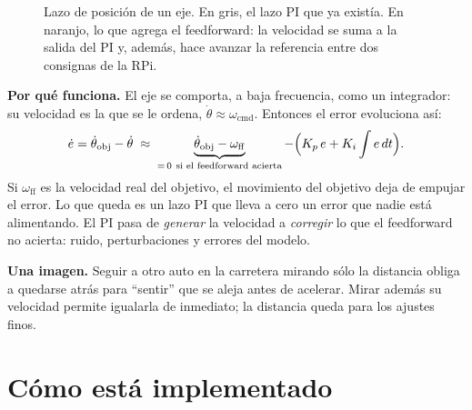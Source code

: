 \documentclass[11pt,a4paper]{article}
\begin{document}
\begin{figure}[H]
\caption{Lazo de posición de un eje. En gris, el lazo PI que ya existía. En naranjo, lo que agrega el feedforward:
la velocidad se suma a la salida del PI y, además, hace avanzar la referencia entre dos consignas de la RPi.}
\label{fig:bloques}
\end{figure}

\textbf{Por qué funciona.} El eje se comporta, a baja frecuencia, como un integrador: su velocidad es la que se
le ordena, $\dot\theta \approx \omega_{\mathrm{cmd}}$. Entonces el error evoluciona así:
\begin{equation}
  \dot e = \dot\theta_{\mathrm{obj}} - \dot\theta \;\approx\; \underbrace{\dot\theta_{\mathrm{obj}} - \omega_{\mathrm{ff}}}_{=\,0\ \text{si el feedforward acierta}} - \Bigl(K_p\, e + K_i \int e\,dt\Bigr).
\end{equation}
Si $\omega_{\mathrm{ff}}$ es la velocidad real del objetivo, el movimiento del objetivo deja de empujar el error.
Lo que queda es un lazo PI que lleva a cero un error que nadie está alimentando. El PI pasa de \emph{generar} la
velocidad a \emph{corregir} lo que el feedforward no acierta: ruido, perturbaciones y errores del modelo.

\textbf{Una imagen.} Seguir a otro auto en la carretera mirando sólo la distancia obliga a quedarse atrás para
``sentir'' que se aleja antes de acelerar. Mirar además su velocidad permite igualarla de inmediato; la distancia
queda para los ajustes finos.

\section{Cómo está implementado}
\end{document}
